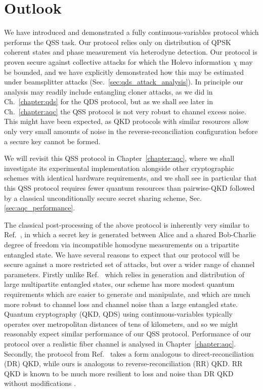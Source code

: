 \FloatBarrier
\section{Outlook}\label{sec:qss_outlook}
We have introduced and demonstrated a fully continuous-variables protocol which performs the QSS task. Our protocol relies only on distribution of QPSK coherent states and phase measurement via heterodyne detection. Our protocol is proven secure against collective attacks for which the Holevo information $\chi$ may be bounded, and we have explicitly demonstrated how this may be estimated under beamsplitter attacks (Sec.~\ref{sec:qds_attack_analysis}). In principle our analysis may readily include entangling cloner attacks, as we did in Ch.~\ref{chapter:qds} for the QDS protocol, but as we shall see later in Ch.~\ref{chapter:aqc} the QSS protocol is not very robust to channel excess noise. This might have been expected, as QKD protocols with similar resources \cite{Papanastasiou2018, Zhao2009} allow only very small amounts of noise in the reverse-reconciliation configuration before a secure key cannot be formed. 

We will revisit this QSS protocol in Chapter~\ref{chapter:aqc}, where we shall investigate its experimental implementation alongside other cryptographic schemes with identical hardware requirements, and we shall see in particular that this QSS protocol requires fewer quantum resources than pairwise-QKD followed by a classical unconditionally secure secret sharing scheme, Sec.
\ref{sec:aqc_performance}.

The classical post-processing of the above protocol is inherently very similar to Ref.~\cite{Kogias2017}, in which a secret key is generated between Alice and a shared Bob-Charlie degree of freedom via incompatible homodyne measurements on a tripartite entangled state. We have several reasons to expect that our protocol will be secure against a more restricted set of attacks, but over a wider range of channel parameters.  Firstly unlike Ref.~\cite{Kogias2017} which relies in generation and distribution of large multipartite entangled states, our scheme has more modest quantum requirements which are easier to generate and manipulate, and which are much more robust to channel loss and channel noise than a large entangled state. Quantum cryptography (QKD, QDS) using continuous-variables typically operates over metropolitan distances of tens of kilometers, and so we might reasonably expect similar performance of our QSS protocol. Performance of our protocol over a realistic fiber channel is analysed in Chapter~\ref{chapter:aqc}. Secondly, the protocol from Ref.~\cite{Kogias2017} takes a form analogous to direct-reconciliation (DR) QKD, while ours is analogous to reverse-reconciliation (RR) QKD. RR QKD is known \cite{Grosshans2002, Grosshans2003, Laudenbach2017} to be much more resilient to loss and noise than DR QKD without modifications \cite{Silberhorn2002}.

